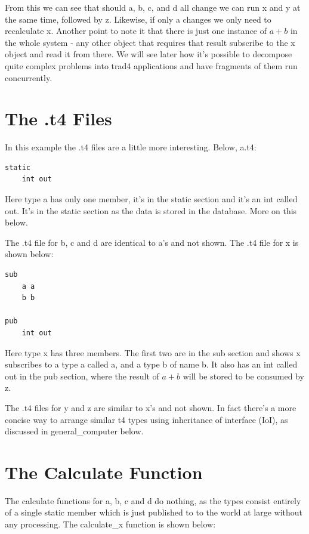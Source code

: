\documentclass{report}
\begin{document}
From this we can see that should a, b, c, and d all change we can run x and y at the same time, followed by z. Likewise, if only a changes we only need to recalculate x. Another point to note it that there is just one instance of \begin{math} a + b\end{math} in the whole system - any other object that requires that result subscribe to the x object and read it from there. We will see later how it's possible to decompose quite complex problems into trad4 applications and have fragments of them run concurrently.

\section{The .t4 Files}

In this example the .t4 files are a little more interesting. Below, a.t4:

\begin{verbatim}
static
    int out
\end{verbatim}

Here type a has only one member, it's in the static section and it's an int called out. It's in the static section as the data is stored in the database. More on this below.

The .t4 file for b, c and d are identical to a's and not shown. The .t4 file for x is shown below:

\begin{verbatim}
sub
    a a
    b b

pub 
    int out
\end{verbatim}

Here type x has three members. The first two are in the sub section and shows x subscribes to a type a called a, and a type b of name b. It also has an int called out in the pub section, where the result of \(a + b\) will be stored to be consumed by z.

The .t4 files for y and z are similar to x's and not shown. In fact there's a more concise way to arrange similar t4 types using inheritance of interface (IoI), as discussed in general_computer below.

\section{The Calculate Function}

The calculate functions for a, b, c and d do nothing, as the types consist entirely of a single static member which is just published to to the world at large without any processing. The calculate_x function is shown below:
\end{document}
